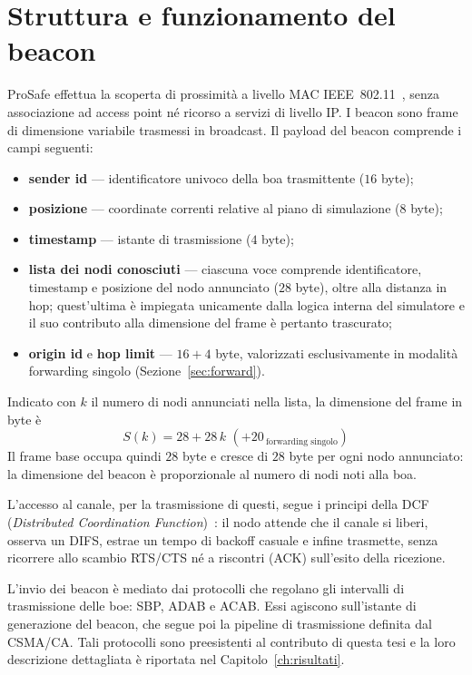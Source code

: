 \section{Struttura e funzionamento del beacon}
\label{sec:commodel}
ProSafe effettua la scoperta di prossimit\`a a livello MAC IEEE~802.11~\cite{ieee80211}, senza associazione
ad access point n\'e ricorso a servizi di livello IP. I beacon sono frame di dimensione
variabile trasmessi in broadcast. Il payload del beacon comprende i campi seguenti:
\begin{itemize}[leftmargin=1.4em,nosep]
  \item \textbf{sender id} --- identificatore univoco della boa trasmittente ($16$ byte);
  \item \textbf{posizione} --- coordinate correnti relative al piano di simulazione ($8$ byte);
  \item \textbf{timestamp} --- istante di trasmissione ($4$ byte);
  \item \textbf{lista dei nodi conosciuti} --- ciascuna voce comprende identificatore,
  timestamp e posizione del nodo annunciato ($28$ byte), oltre alla distanza in hop;
  quest'ultima \`e impiegata unicamente dalla logica interna del simulatore e il suo
  contributo alla dimensione del frame \`e pertanto trascurato;
  \item \textbf{origin id} e \textbf{hop limit} --- $16+4$ byte, valorizzati esclusivamente
  in modalit\`a forwarding singolo (Sezione~\ref{sec:forward}).
\end{itemize}
Indicato con $k$ il numero di nodi annunciati nella lista, la dimensione del frame in byte
\`e
\begin{equation}
  S(k) = 28 + 28\,k \,\,(+ 20\,_{\text{forwarding singolo}})
  \label{eq:beacon-size}
\end{equation}
Il frame base occupa quindi $28$ byte e cresce di $28$ byte per ogni nodo annunciato: la
dimensione del beacon \`e proporzionale al numero di nodi noti alla boa.

L'accesso al canale, per la trasmissione di questi, segue i principi della DCF (\emph{Distributed Coordination Function})~\cite{sharetechnote-dcf,csma-ca}:
il nodo attende che il canale si liberi, osserva un DIFS, estrae un tempo di backoff
casuale e infine trasmette, senza ricorrere allo scambio RTS/CTS n\'e a riscontri (ACK)
sull'esito della ricezione.

L'invio dei beacon \`e mediato dai protocolli che regolano gli intervalli di
trasmissione delle boe: SBP, ADAB e ACAB. Essi agiscono sull'istante di
generazione del beacon, che segue poi la pipeline di trasmissione definita dal CSMA/CA.
Tali protocolli sono preesistenti al contributo di questa tesi e la loro descrizione
dettagliata \`e riportata nel Capitolo~\ref{ch:risultati}.

